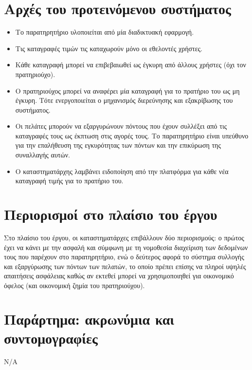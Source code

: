 \documentclass[a4paper,oneside, 12pt]{article}
\begin{document}
\section{Αρχές του προτεινόμενου συστήματος}

\begin{itemize}
	\item Το παρατηρητήριο υλοποιείται από μία διαδικτυακή εφαρμογή.
	\item Τις καταγραφές τιμών τις καταχωρούν μόνο οι εθελοντές χρήστες.
	\item Κάθε καταγραφή μπορεί να επιβεβαιωθεί ως έγκυρη από άλλους χρήστες (όχι τον
	πρατηριούχο).
	\item Ο πρατηριούχος μπορεί να αναφέρει μία καταγραφή για το πρατήριο του ως μη
	έγκυρη. Τότε ενεργοποιείται ο μηχανισμός διερεύνησης και εξακρίβωσης του
	συστήματος.
	\item Οι πελάτες μπορούν να εξαργυρώνουν πόντους που έχουν συλλέξει από τις
	καταγραφές τους ως έκπτωση στις αγορές τους. Το παρατηρητήριο είναι υπεύθυνο για την επαλήθευση της εγκυρότητας των πόντων και την επικύρωση
	της συναλλαγής αυτών.
	\item 	Ο καταστηματάρχης λαμβάνει ειδοποίηση από την πλατφόρμα για κάθε νέα
	καταγραφή τιμής για το πρατήριο του.
\end{itemize}

\section{Περιορισμοί στο πλαίσιο του έργου}

Στο πλαίσιο του έργου, οι καταστηματάρχες επιβάλλουν δύο περιορισμούς: ο πρώτος
έχει να κάνει με την ασφαλή και σύμφωνη με τη νομοθεσία διαχείριση των δεδομένων
τους που παρέχουν στο παρατηρητήριο, ενώ ο δεύτερος αφορά το σύστημα συλλογής
και εξαργύρωσης των πόντων των πελατών, το οποίο πρέπει επίσης να πληροί υψηλές
απαιτήσεις ασφάλειας καθώς αν εκτεθεί μπορεί να χρησιμοποιηθεί για οικονομικό
όφελος (και οικονομική ζημία του πρατηριούχου).

\section{Παράρτημα: ακρωνύμια και συντομογραφίες}

Ν/Α
\end{document}
